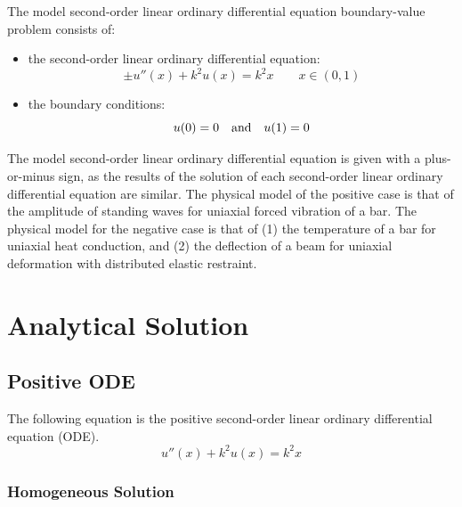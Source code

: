 \documentclass[10pt, reqno]{article}		%
\numberwithin{equation}{section}
\begin{document}
The model second-order linear ordinary differential equation boundary-value problem consists of:
\begin{itemize}
	\item the second-order linear ordinary differential equation:
	\begin{equation}
	\pm u''(x)+k^2u(x)=k^2x \qquad x \in (0, 1)
	\end{equation}
	\item the boundary conditions:
	\begin{equation}
	u(0) = 0 \quad \textnormal{and} \quad u(1) = 0 
	\end{equation}
\end{itemize}
The model second-order linear ordinary differential equation is given with a plus-or-minus sign, as the results of the solution of each second-order linear ordinary differential equation are similar. The physical model of the positive case is that of the amplitude of standing waves for uniaxial forced vibration of a bar. The physical model for the negative case is that of (1) the temperature of a bar for uniaxial heat conduction, and (2) the deflection of a beam for uniaxial deformation with distributed elastic restraint.

\newpage

\section{Analytical Solution}

\subsection{Positive ODE}

The following equation is the positive second-order linear ordinary differential equation (ODE).
\begin{equation}
u''(x)+k^2u(x)=k^2x
\end{equation}

\subsubsection{Homogeneous Solution}
\end{document}
